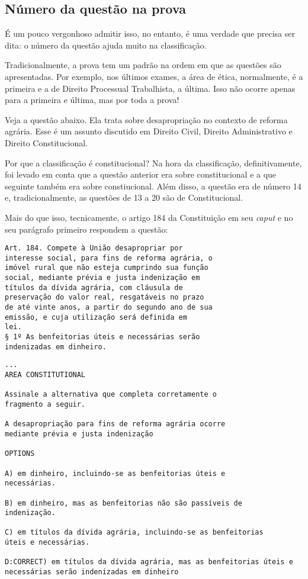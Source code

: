 \documentclass{article}
\begin{document}
\subsection{Número da questão na prova}

É um pouco vergonhoso admitir isso, no entanto, é uma verdade que
precisa ser dita: o número da questão ajuda muito na classificação.

Tradicionalmente, a prova tem um padrão na ordem em que as questões
são apresentadas. Por exemplo, nos últimos exames, a área de ética,
normalmente, é a primeira e a de Direito Processual Trabalhista, a
última. Isso não ocorre apenas para a primeira e última, mas por toda
a prova!

Veja a questão abaixo. Ela trata sobre desapropriação no contexto de
reforma agrária. Esse é um assunto discutido em Direito Civil, Direito
Administrativo e Direito Constitucional.

Por que a classificação é constitucional? Na hora da classificação,
definitivamente, foi levado em conta que a questão anterior era sobre
constitucional e a que seguinte também era sobre constiucional. Além
disso, a questão era de número 14 e, tradicionalmente, as questões de
13 a 20 são de Constitucional.

Mais do que isso, tecnicamente, o artigo 184 da Constituição em seu
\textit{caput} e no seu parágrafo primeiro respondem a questão:

\begin{verbatim}
Art. 184. Compete à União desapropriar por
interesse social, para fins de reforma agrária, o
imóvel rural que não esteja cumprindo sua função
social, mediante prévia e justa indenização em
títulos da dívida agrária, com cláusula de
preservação do valor real, resgatáveis no prazo
de até vinte anos, a partir do segundo ano de sua
emissão, e cuja utilização será definida em
lei.
§ 1º As benfeitorias úteis e necessárias serão
indenizadas em dinheiro.
\end{verbatim}


\begin{verbatim}
...
AREA CONSTITUTIONAL
  
Assinale a alternativa que completa corretamente o 
fragmento a seguir. 

A desapropriação para fins de reforma agrária ocorre 
mediante prévia e justa indenização  

OPTIONS 

A) em dinheiro, incluindo-se as benfeitorias úteis e 
necessárias. 

B) em dinheiro, mas as benfeitorias não são passíveis de 
indenização. 

C) em títulos da dívida agrária, incluindo-se as benfeitorias 
úteis e necessárias. 

D:CORRECT) em títulos da dívida agrária, mas as benfeitorias úteis e 
necessárias serão indenizadas em dinheiro
\end{verbatim}
\end{document}
